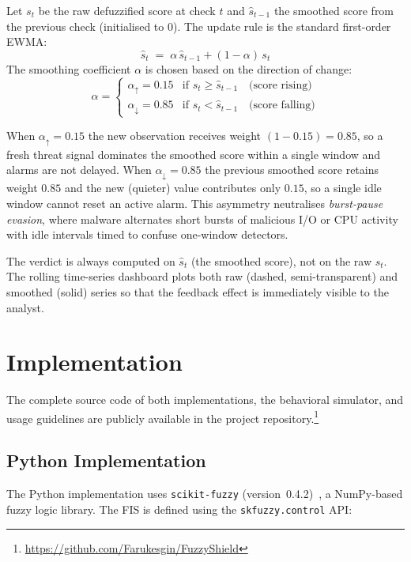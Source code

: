 \documentclass[conference]{IEEEtran}
\begin{document}
Let $s_t$ be the raw defuzzified score at check $t$ and $\hat{s}_{t-1}$
the smoothed score from the previous check (initialised to $0$). The
update rule is the standard first-order EWMA:
\[
  \hat{s}_t \;=\; \alpha\,\hat{s}_{t-1} + (1-\alpha)\,s_t
\]
The smoothing coefficient $\alpha$ is chosen based on the direction of
change:
\[
  \alpha = \begin{cases}
    \alpha_{\uparrow} = 0.15 & \text{if } s_t \geq \hat{s}_{t-1}
                               \quad\text{(score rising)}\\[4pt]
    \alpha_{\downarrow} = 0.85 & \text{if } s_t < \hat{s}_{t-1}
                               \quad\text{(score falling)}
  \end{cases}
\]

When $\alpha_{\uparrow}=0.15$ the new observation receives weight
$(1{-}0.15)=0.85$, so a fresh threat signal dominates the smoothed score
within a single window and alarms are not delayed. When
$\alpha_{\downarrow}=0.85$ the previous smoothed score retains weight
$0.85$ and the new (quieter) value contributes only $0.15$, so a single
idle window cannot reset an active alarm. This asymmetry neutralises
\emph{burst-pause evasion}, where malware alternates short bursts of
malicious I/O or CPU activity with idle intervals timed to confuse
one-window detectors.

The verdict is always computed on $\hat{s}_t$ (the smoothed score), not
on the raw $s_t$. The rolling time-series dashboard plots both raw
(dashed, semi-transparent) and smoothed (solid) series so that the
feedback effect is immediately visible to the analyst.

\section{Implementation}

The complete source code of both implementations, the behavioral
simulator, and usage guidelines are publicly available in the project
repository.\footnote{\url{https://github.com/Farukesgin/FuzzyShield}}

\subsection{Python Implementation}

The Python implementation uses \texttt{scikit-fuzzy}
(version~0.4.2)~\cite{warner2019skfuzzy}, a NumPy-based fuzzy logic
library. The FIS is defined using the \texttt{skfuzzy.control} API:
\end{document}
